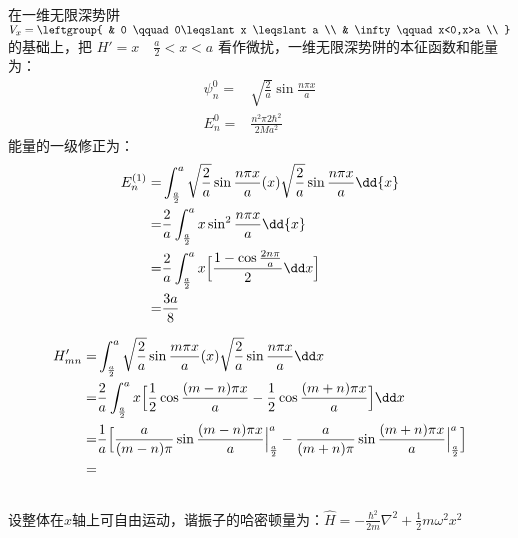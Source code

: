 \subsection{ }
在一维无限深势阱 $V_{x} = \leftgroup{
    & 0 \qquad 0\leqslant x \leqslant a \\
    & \infty \qquad x<0,x>a \\
}$ 的基础上，把 $H' = x \quad \frac{a}{2} < x < a $ 看作微扰，一维无限深势阱的本征函数和能量为：\\
\begin{align}
\psi^{0}_{n}=& \sqrt{\frac{2}{a}} \sin{\frac{n\pi x}{a}}\\
E^{0}_{n}=& \frac{n^{2}\pi{2}\hbar^{2}}{2Ma^2}
\end{align}
能量的一级修正为：\\
\begin{equation}
\begin{aligned}
E^{(1)}_{n}=&\int^{a}_{\frac{a}{2}} \sqrt{\frac{2}{a}} \sin{\frac{n\pi x}{a}}(x)\sqrt{\frac{2}{a}} \sin{\frac{n\pi x}{a}} \dd{x} \\
=& \frac{2}{a} \int^{a}_{\frac{a}{2}} x\sin^{2}{\frac{n\pi x}{a}} \dd{x} \\
=& \frac{2}{a}\int^{a}_{\frac{a}{2}} x\Bigl[\frac{1-\cos{\frac{2n \pi}{a}}}{2}\dd x\Bigr] \\
=& \frac{3a}{8}
\end{aligned}
\end{equation}

\begin{equation}
\begin{aligned}
H'_{mn} =& \int^{a}_{\frac{a}{2}} \sqrt{\frac{2}{a}} \sin{\frac{m \pi x}{a}} (x) \sqrt{\frac{2}{a} }\sin{\frac{n \pi x}{a}} \dd x \\
=& \frac{2}{a} \int^{a}_{\frac{a}{2}} x\Bigl[\frac{1}{2} \cos{\frac{(m-n)\pi x}{a}} - \frac{1}{2} \cos{\frac{(m+n) \pi x}{a}}\Bigr] \dd x \\
=& \frac{1}{a} \Bigl[\frac{a}{(m-n)\pi} \sin{\frac{(m-n)\pi x}{a}}\Big|^{a}_{\frac{a}{2}} - \frac{a}{(m+n)\pi} \sin{\frac{(m+n)\pi x}{a}}\Big|^{a}_{\frac{a}{2}}\Bigr] \\
=&
\end{aligned}
\end{equation}
\subsection{ }
设整体在$x$轴上可自由运动，谐振子的哈密顿量为：$\hat{H} = -\frac{\hbar^{2}}{2m} \nabla^{2}+\frac{1}{2}m\omega^{2}x^{2} $ \\

